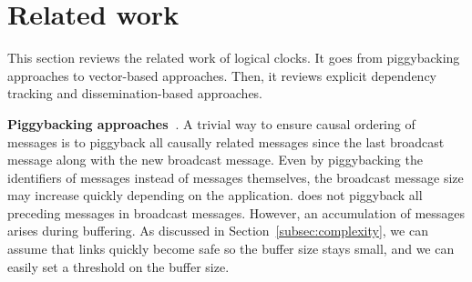 
\section{Related work}
\label{sec:relatedwork}

This section reviews the related work of logical clocks. It goes from
piggybacking approaches to vector-based approaches. Then, it reviews explicit
dependency tracking and dissemination-based approaches.

\noindent \textbf{Piggybacking
  approaches~\cite{birman1987reliable,hadzilacos1993fault}}. A trivial way to
ensure causal ordering of messages is to piggyback all causally related messages
since the last broadcast message along with the new broadcast message. Even by
piggybacking the identifiers of messages instead of messages themselves, the
broadcast message size may increase quickly depending on the
application. \CBROADCAST does not piggyback all preceding messages in broadcast
messages. However, an accumulation of messages arises during buffering. As
discussed in Section~\ref{subsec:complexity}, we can assume that links quickly
become safe so the buffer size stays small, and we can easily set a threshold on
the buffer size.%

